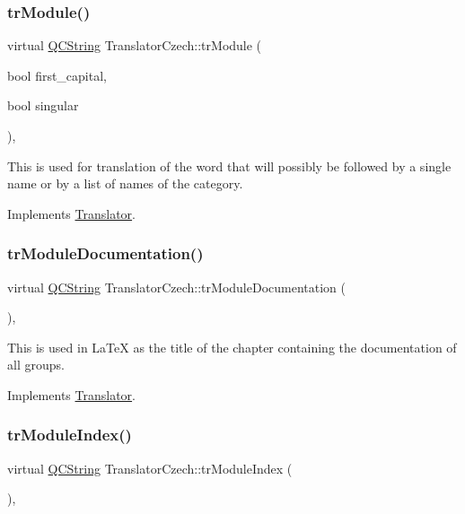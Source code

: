 \subsubsection{\texorpdfstring{trModule()}{trModule()}}
{\footnotesize\ttfamily virtual \mbox{\hyperlink{class_q_c_string}{Q\+C\+String}} Translator\+Czech\+::tr\+Module (\begin{DoxyParamCaption}\item[{bool}]{first\+\_\+capital,  }\item[{bool}]{singular }\end{DoxyParamCaption})\hspace{0.3cm}{\ttfamily [inline]}, {\ttfamily [virtual]}}

This is used for translation of the word that will possibly be followed by a single name or by a list of names of the category. 

Implements \mbox{\hyperlink{class_translator}{Translator}}.

\mbox{\label{class_translator_czech_abf8b491a59842cd36807f9eb2fac269a}} 
\subsubsection{\texorpdfstring{trModuleDocumentation()}{trModuleDocumentation()}}
{\footnotesize\ttfamily virtual \mbox{\hyperlink{class_q_c_string}{Q\+C\+String}} Translator\+Czech\+::tr\+Module\+Documentation (\begin{DoxyParamCaption}{ }\end{DoxyParamCaption})\hspace{0.3cm}{\ttfamily [inline]}, {\ttfamily [virtual]}}

This is used in La\+TeX as the title of the chapter containing the documentation of all groups. 

Implements \mbox{\hyperlink{class_translator}{Translator}}.

\mbox{\label{class_translator_czech_a8e4934dd0d52c8bc1c44063189c4a07b}} 
\subsubsection{\texorpdfstring{trModuleIndex()}{trModuleIndex()}}
{\footnotesize\ttfamily virtual \mbox{\hyperlink{class_q_c_string}{Q\+C\+String}} Translator\+Czech\+::tr\+Module\+Index (\begin{DoxyParamCaption}{ }\end{DoxyParamCaption})\hspace{0.3cm}{\ttfamily [inline]}, {\ttfamily [virtual]}}

